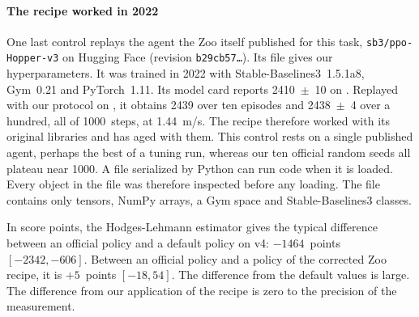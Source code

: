 


\paragraph{The recipe worked in 2022}
One last control replays the agent the Zoo itself published for this
task, \texttt{sb3/ppo-Hopper-v3} on Hugging Face (revision \texttt{b29cb57\dots}). Its  file gives our hyperparameters. It was trained in 2022
with Stable-Baselines3~1.5.1a8, Gym~0.21 and PyTorch~1.11. Its model card reports \num{2410}~$\pm$~10 on
. Replayed with our protocol on , it obtains \num{2439} over ten episodes and
\num{2438}~$\pm$~4 over a hundred, all of \num{1000}~steps, at 1.44~m/s.
The recipe therefore worked with its original libraries and has aged with
them. This control rests on a single published agent, perhaps the best of a tuning run, whereas our ten
official random seeds all plateau near \num{1000}. A file serialized by Python can run code when it is
loaded. Every object in the file was therefore inspected before any loading. The file contains only tensors,
NumPy arrays, a Gym space and Stable-Baselines3 classes.

In score points, the Hodges-Lehmann estimator gives
the typical difference between an official policy and a default policy on v4: $-\num{1464}$~points
$[-\num{2342}, -606]$. Between an official policy and a policy of the corrected Zoo recipe, it is $+5$~points
$[-18, 54]$. The difference from the default values is large. The difference from our application of the
recipe is zero to the precision of the measurement.

